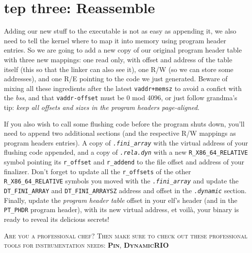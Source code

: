 \documentclass[twocolumn, 10pt]{article}
\begin{document}
\section*{tep three: Reassemble}

Adding our new stuff to the executable is not as easy as appending it, we also need to tell the
kernel where to map it into memory using program header entries.
So we are going to add a new copy of our original program header table with three new mappings: one
read only, with offset and address of the table itself (this so that the linker can also see it), one
R/W (so we can store some addresses), and one R/E pointing to the code we just generated. Beware of
mixing all these ingredients after the latest \texttt{vaddr+memsz} to avoid a confict with the
\textit{bss}, and that \texttt{vaddr-offset} must be 0 mod 4096, or just follow grandma's tip:
\textsl{keep all offsets and sizes in the program headers page-aligned}.

If you also wish to call some flushing code before the program shuts down, you'll need to append two
additional sections (and the respective R/W mappings as program headers entries).
A copy of \texttt{\textit{.fini\_array}} with the virtual address of your flushing code appended, and
a copy of \texttt{\textit{.rela.dyn}} with a new \texttt{R\_X86\_64\_RELATIVE} symbol pointing its
\texttt{r\_offset} and \texttt{r\_addend} to the file offset and address of your finalizer.
Don't forget to update all the \texttt{r\_offsets} of the other \texttt{R\_X86\_64\_RELATIVE} symbols
you moved with the \texttt{\textit{.fini\_array}} and update the \texttt{DT\_FINI\_ARRAY} and
\texttt{DT\_FINI\_ARRAYSZ} address and offset in the \texttt{\textit{.dynamic}} section.
Finally, update the \textit{program header table} offset in your elf's header
(and in the \texttt{PT\_PHDR} program header), with its new virtual address, et voilà, your binary
is ready to reveal its delicious secrets!

\textsc{\small Are you a professional chef? Then make sure to check out these professional tools for
instrumentation needs: \textbf{Pin}, \textbf{DynamicRIO}}
\end{document}
